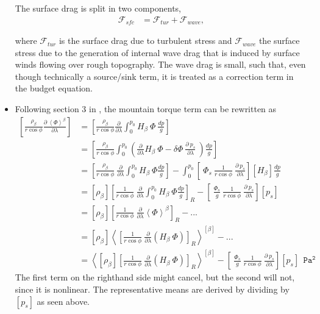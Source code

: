 \documentclass[11pt]{article}
\numberwithin{equation}{section}
\newcommand{\la}{\langle}
\newcommand{\ra}{\rangle}
\newcommand{\lara}[1]{\left\la{#1}\right\ra}
\newcommand{\cphi}{\cos \phi}
\newcommand{\rb}{\rho_\beta}
\begin{document}
\begin{itemize}
The surface drag is split in two components,
\begin{align}
\mathcal{F}_{sfc}&= \mathcal{F}_{tur} + \mathcal{F}_{wave},
\end{align}

where $\mathcal{F}_{tur}$ is the surface drag due to turbulent stress and $\mathcal{F}_{wave}$ the surface stress due to the generation of internal wave drag that is induced by surface winds flowing over rough topography. The wave drag is small, such that, even though technically a source/sink term, it is treated as a correction term in the budget equation.


\item Following section 3 in \citet{Boer1982}, the mountain torque term can be rewritten as 
\begin{align*}
\left[\frac{\rb }{r \cphi} \frac{\partial~\lara{\Phi}^\beta  }{\partial \lambda}  \right] & = \left[ \frac{\rb}{r \cphi} \frac{\partial}{\partial \lambda}  \int_0^{p_0} H_\beta  ~\Phi ~ \frac{dp}{g}\right]\\
&= \left[ \frac{\rb}{r \cphi} \int_0^{p_0}   \left( \frac{\partial}{\partial \lambda}  H_\beta  ~\Phi - \delta \Phi ~ \frac{\partial~p_s}{\partial \lambda} ~ \right) \frac{dp}{g}\right]\\
&= \left[ \frac{\rb}{r \cphi} ~ \frac{\partial}{\partial \lambda}  \int_0^{p_0} H_\beta  ~\Phi  \frac{dp}{g}\right] - \int_0^{p_0}  \left[~\Phi_s~ \frac{1}{r \cphi} ~\frac{\partial~p_s}{\partial \lambda}\right] [H_\beta] \frac{dp}{g}\\
&= [\rb]  \left[ \frac{1}{r \cphi} ~ \frac{\partial}{\partial \lambda}  \int_0^{p_0} H_\beta  ~\Phi  \frac{dp}{g}\right]_R - \left[~\frac{\Phi_s}{g}~ \frac{1}{r \cphi} ~\frac{\partial~p_s}{\partial \lambda}\right] [p_s] \\
&= [\rb]  \left[ \frac{1}{r \cphi} ~ \frac{\partial}{\partial \lambda}  \lara{\Phi}^\beta \right]_R - ... \\
&= [\rb]  \lara{ \left[ \frac{1}{r \cphi} ~ \frac{\partial}{\partial \lambda} \left( H_\beta  ~\Phi  \right)   \right]_R}^{[\beta]} - ...  \\
&=\lara{  [\rb]   \left[ \frac{1}{r \cphi} ~ \frac{\partial}{\partial \lambda} \left( H_\beta  ~\Phi  \right)   \right]_R}^{[\beta]} - \left[~\frac{\Phi_s}{g}~ \frac{1}{r \cphi} ~\frac{\partial~p_s}{\partial \lambda}\right]  [p_s]~~\mathtt{Pa^2} 
\end{align*}
The first term on the righthand side might cancel, but the second will not, since it is nonlinear. The representative means are derived by dividing by $[p_s]$ as seen above.
\end{itemize}
\end{document}

